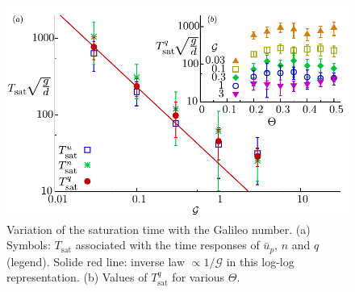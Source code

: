 \begin{figure}
    \centering
    \includegraphics[width=0.75\linewidth]{04-figuras/TM-tRe.pdf}
    \caption[Saturation time $T_\textrm{sat}$ for the transport.]{Variation of the saturation time with the Galileo number. (a) Symbols: $T_\textrm{sat}$ associated with the time responses of $\bar{u}_p$, $n$ and $q$ (legend). Solide red line: inverse law $\propto 1/\mathcal{G}$ in this log-log representation. (b) Values of $T^q_\textrm{sat}$ for various $\Theta$.}
    \label{fig:TM_tsat}
\end{figure}

